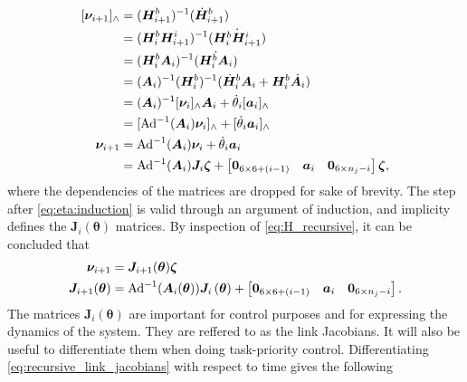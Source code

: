 \begin{subequations}
    \label{eq:H_recursive}
\begin{align}
    [\bm{\nu}_{i+1}]_{\wedge} &= (\bm{H}_{i+1}^b)^{-1}(\dot{\bm{H}}_{i+1}^b) \\
    &= (\bm{H}_{i}^b\bm{H}_{i+1}^i)^{-1}(\dot{\bm{H}_{i}^b\bm{H}_{i+1}^i}) \\
    &= (\bm{H}_{i}^b\bm{A}_i)^{-1}(\dot{\bm{H}_{i}^b\bm{A}_i}) \\
    &= (\bm{A}_i)^{-1}(\bm{H}_{i}^b)^{-1}(\dot{\bm{H}}_{i}^b\bm{A}_i + \bm{H}_{i}^b\dot{\bm{A}}_i) \\
    &= (\bm{A}_i)^{-1}[\bm{\nu}_i]_{\wedge}\bm{A}_i + \dot{\theta}_i[\bm{a}_i]_{\wedge} \\
    &= [\operatorname{Ad}^{-1}(\bm{A}_i)\bm{\nu}_i]_{\wedge} + [\dot{\theta}_i\bm{a}_i]_{\wedge} \label{eq:eta:induction}\\
    \bm{\nu}_{i+1} &= \operatorname{Ad}^{-1}(\bm{A}_i)\bm{\nu}_i + \dot{\theta}_i\bm{a}_i \\
    &= \operatorname{Ad}^{-1}(\bm{A}_i)\bm{J}_i\bm{\zeta} + \begin{bmatrix}\bm{0}_{6\times6+(i-1)} & \bm{a}_i & \bm{0}_{6\times n_j-i}\end{bmatrix}\bm{\zeta},
\end{align}
\end{subequations}
where the dependencies of the matrices are dropped for sake of brevity.
The step after \autoref{eq:eta:induction} is valid through an argument of induction, and
implicity defines the $\bm{J}_i(\bm{\theta})$ matrices.
By inspection of \autoref{eq:H_recursive}, it can be concluded that
\begin{subequations}
\label{eq:recursive_link_jacobians}
\begin{align}
    \bm{\nu}_{i+1} &= \bm{J}_{i+1}(\bm{\theta}) \bm{\zeta} \\
    \bm{J}_{i+1}(\bm{\theta}) &= 
    \operatorname{Ad}^{-1}(\bm{A}_i(\bm{\theta}))\bm{J}_i\left(\bm{\theta}\right) + \begin{bmatrix}\bm{0}_{6\times6+(i-1)} & \bm{a}_i & \bm{0}_{6\times n_j-i}\end{bmatrix}.
\end{align}
\end{subequations}
The matrices $\bm{J}_i(\bm{\theta})$ are important for control purposes and for expressing the 
dynamics of the system. They are reffered to as the link Jacobians. It will also 
be useful to differentiate them when doing task-priority control. Differentiating
\autoref{eq:recursive_link_jacobians} with respect to time gives the following
